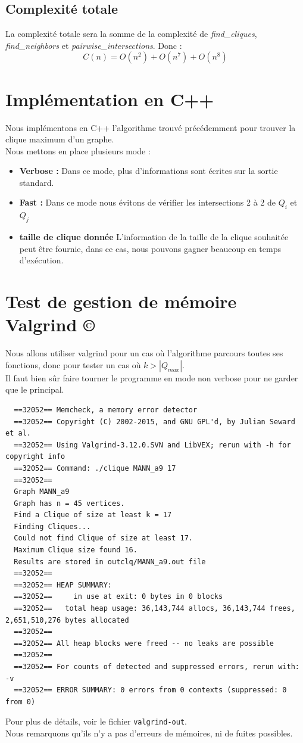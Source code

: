 \documentclass{article}
\begin{document}
\subsection{Complexité totale}
La complexité totale sera la somme de la complexité de \textit{find\_cliques}, \textit{find\_neighbors}
et \textit{pairwise\_intersections}. Donc :
\begin{displaymath}
C(n)=O(n^2)+O(n^7)+O(n^8)
\end{displaymath}

\section{Implémentation en C++}
Nous implémentons en C++ l'algorithme trouvé précédemment pour trouver la clique
maximum d'un graphe.\\
Nous mettons en place plusieurs mode :
\begin{itemize}
  \item \textbf{Verbose :} Dans ce mode, plus d'informations sont écrites sur la sortie standard.
  \item \textbf{Fast :} Dans ce mode nous évitons de vérifier les intersections 2 à 2 de $Q_i$ et $Q_j$
  \item \textbf{taille de clique donnée} L'information de la taille de la clique souhaitée peut être fournie, dans
    ce cas, nous pouvons gagner beaucoup en temps d'exécution.
\end{itemize}
\section{Test de gestion de mémoire Valgrind ©}
Nous allons utiliser valgrind pour un cas où l'algorithme parcours toutes ses fonctions, donc
pour tester un cas où $k > |Q_{max}|$.\\
Il faut bien sûr faire tourner le programme en mode non verbose pour ne garder que le principal.
\begin{verbatim}
  ==32052== Memcheck, a memory error detector
  ==32052== Copyright (C) 2002-2015, and GNU GPL'd, by Julian Seward et al.
  ==32052== Using Valgrind-3.12.0.SVN and LibVEX; rerun with -h for copyright info
  ==32052== Command: ./clique MANN_a9 17
  ==32052==
  Graph MANN_a9
  Graph has n = 45 vertices.
  Find a Clique of size at least k = 17
  Finding Cliques...
  Could not find Clique of size at least 17.
  Maximum Clique size found 16.
  Results are stored in outclq/MANN_a9.out file
  ==32052==
  ==32052== HEAP SUMMARY:
  ==32052==     in use at exit: 0 bytes in 0 blocks
  ==32052==   total heap usage: 36,143,744 allocs, 36,143,744 frees, 2,651,510,276 bytes allocated
  ==32052==
  ==32052== All heap blocks were freed -- no leaks are possible
  ==32052==
  ==32052== For counts of detected and suppressed errors, rerun with: -v
  ==32052== ERROR SUMMARY: 0 errors from 0 contexts (suppressed: 0 from 0)
\end{verbatim}
Pour plus de détails, voir le fichier \texttt{valgrind-out}.\\
Nous remarquons qu'ils n'y a pas d'erreurs de mémoires, ni de fuites possibles.
\end{document}
